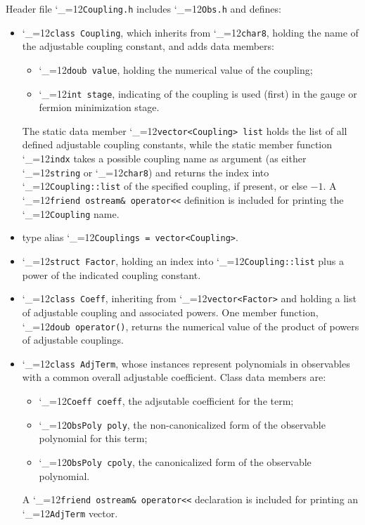 \documentclass [12pt]{article}
\makeatletter
\renewcommand{\tt}{\begingroup\catcode`_=12\def\_{\string_}\tt@}
\newcommand{\tt@}[1]{\texttt{#1}\endgroup}
\makeatother
\begin{document}
Header file \tt{Coupling.h}
includes \tt{Obs.h} and defines:
\begin{itemize}
\item
    \tt{class Coupling}, which inherits from \tt{char8},
    holding the name of the adjustable coupling constant,
    and adds data members:
    \begin{itemize}
    \item
	\tt{doub value}, holding the numerical value of the coupling;
    \item
	\tt{int stage}, indicating of the coupling is used (first)
	in the gauge or fermion minimization stage.
    \end{itemize}

    The static data member
    \tt{vector<Coupling> list} holds the list of all
    defined adjustable coupling constants, while
    the static member function
    \tt{indx} takes a possible coupling name as argument
    (as either \tt{string} or \tt{char8})
    and returns the index into \tt{Coupling::list} of the specified
    coupling, if present, or else $-1$.
    A \tt{friend ostream\& operator<<} definition
    is included for printing the \tt{Coupling} name.

\item
    type alias \tt{Couplings = vector<Coupling>}.

\item
    \tt{struct Factor}, holding an index into
    \tt{Coupling::list} plus a power of the indicated
    coupling constant.

\item
    \tt{class Coeff}, inheriting from
    \tt{vector<Factor>} and holding a list of
    adjustable coupling and associated powers.
    One member function,
    \tt{doub operator()}, returns the
    numerical value of the product of powers of adjustable couplings.

\item
    \tt{class AdjTerm},
    whose instances
    represent polynomials in observables with a common
    overall adjustable coefficient.
    Class data members are:
    \begin{itemize}
    \item
	\tt{Coeff coeff}, the adjsutable coefficient for the term;
    \item
	\tt{ObsPoly poly}, the non-canonicalized form of the observable polynomial
	for this term;
    \item
	\tt{ObsPoly cpoly}, the canonicalized form of the observable polynomial.
    \end{itemize}
    A \tt{friend ostream\& operator<<} declaration
    is included for printing an \tt{AdjTerm} vector.
\end{itemize}
\end{document}
